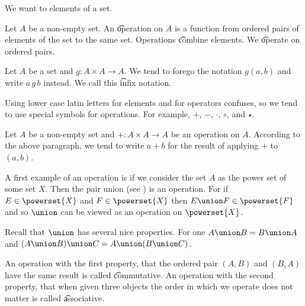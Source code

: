 

We want to  elements of a set.


Let $A$ be a non-empty set.
An \t{operation} on $A$ is a function from ordered pairs of elements of the set to the same set.
Operations \t{combine} elements.
We \t{operate} on ordered pairs.


Let $A$ be a set and $g: A \times A \to A$.
We tend to forego the notation $g(a, b)$ and write $a\,g\,b$ instead.
We call this \t{infix notation}.

Using lower case latin
letters for elements and for operators
confuses, so we tend to use
special symbols for operations.
For example,
$+$, $-$, $\cdot$, $\circ$, and $\star$.

Let $A$ be a non-empty set
and $+: A \times A \to A$ be
an operation on $A$.
According to the above paragraph,
we tend to write
$a+b$ for the result of applying $+$
to $(a,b)$.


A first example of an operation is if we consider the set $A$ as the power set of some set $X$.
Then the pair union (see ) is an operation.
For if $E \in \powerset{X}$ and $F \in \powerset{X}$ then $E \union F \in \powerset{F}$ and so $\union$ can be viewed as an operation on $\powerset{X}$.


Recall that $\union$ has several nice properties.
For one $A \union B = B \union A$ and $(A \union B) \union C = A \union (B \union C)$.

An operation with the first property, that the ordered pair $(A, B)$ and $(B, A)$ have the same result is called \t{commutative}.
An operation with the second property, that when given three objects the order in which we operate does not matter is called \t{associative}.